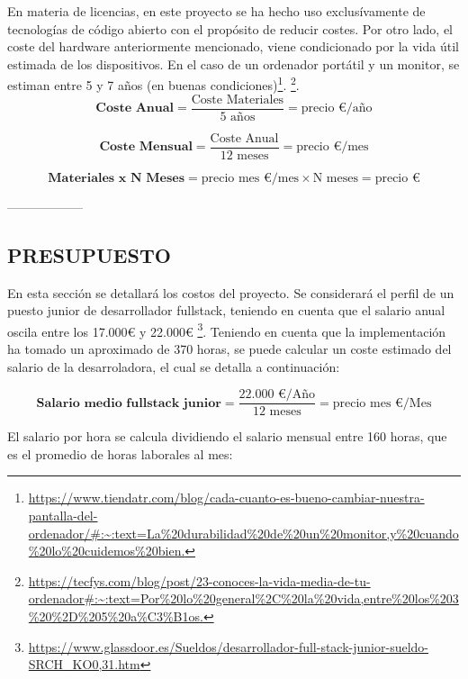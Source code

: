 En materia de licencias, en este proyecto se ha hecho uso exclusívamente de tecnologías de código abierto con el
propósito de reducir costes. Por otro lado, el coste del hardware anteriormente mencionado, viene condicionado
por la vida útil estimada de los dispositivos. En el caso de un ordenador portátil y un monitor, se estiman entre
5 y 7 años (en buenas condiciones)\footnote{\url{https://www.tiendatr.com/blog/cada-cuanto-es-bueno-cambiar-nuestra-pantalla-del-ordenador/#:~:text=La%20durabilidad%20de%20un%20monitor,y%20cuando%20lo%20cuidemos%20bien.}}.
\footnote{\url{https://tecfys.com/blog/post/23-conoces-la-vida-media-de-tu-ordenador#:~:text=Por%20lo%20general%2C%20la%20vida,entre%20los%203%20%2D%205%20a%C3%B1os.}}.
\begin{equation}
    \textbf{Coste Anual} = \frac {\text{Coste Materiales}}{\text{5 años}} = \text{precio €/año}
\end{equation}

\begin{equation}
    \textbf{Coste Mensual} = \frac {\text{Coste Anual}}{\text{12 meses}} = \text{precio €/mes}
\end{equation}

\begin{equation}
    \textbf{Materiales x N Meses} = \text{precio mes €/mes} \times \text{N meses} = \text{precio €}
\end{equation}

------------------

\subsection{PRESUPUESTO}

En esta sección se detallará los costos del proyecto. Se considerará el perfil de un puesto junior de desarrollador fullstack,
teniendo en cuenta que el salario anual oscila entre los 17.000€ y 22.000€ \footnote{\url{https://www.glassdoor.es/Sueldos/desarrollador-full-stack-junior-sueldo-SRCH_KO0,31.htm}}.
Teniendo en cuenta que la implementación ha tomado un aproximado de 370 horas, se puede calcular un coste estimado del salario de la desarroladora, el cual se detalla a continuación:

\begin{equation}
    \textbf{Salario medio fullstack junior} =  \frac {\text{22.000 €/Año} }{ \text{12 meses}} = \text{precio mes €/Mes}
\end{equation}

El salario por hora se calcula dividiendo el salario mensual entre 160 horas, que es el promedio de horas laborales al mes:

